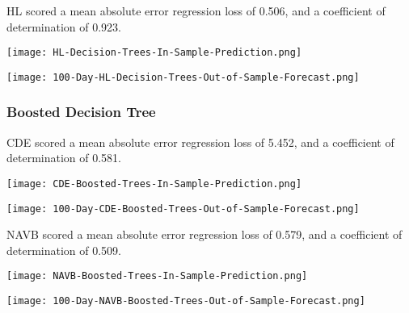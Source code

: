HL scored a mean absolute error regression loss of 0.506, and a coefficient of determination of 0.923.

\begin{center}
    \texttt{[image: HL-Decision-Trees-In-Sample-Prediction.png]}
    \label{fig:nonfloat}
\end{center}

\begin{center}  
    \texttt{[image: 100-Day-HL-Decision-Trees-Out-of-Sample-Forecast.png]}
    \label{fig:nonfloat}
\end{center}

\subsubsection{Boosted Decision Tree}

CDE scored a mean absolute error regression loss of 5.452, and a coefficient of determination of 0.581.

\begin{center}
    \texttt{[image: CDE-Boosted-Trees-In-Sample-Prediction.png]}
    \label{fig:nonfloat}
\end{center}

\begin{center}  
    \texttt{[image: 100-Day-CDE-Boosted-Trees-Out-of-Sample-Forecast.png]}
    \label{fig:nonfloat}
\end{center}

NAVB scored a mean absolute error regression loss of 0.579, and a coefficient of determination of 0.509.

\begin{center}
    \texttt{[image: NAVB-Boosted-Trees-In-Sample-Prediction.png]}
    \label{fig:nonfloat}
\end{center}

\begin{center}  
    \texttt{[image: 100-Day-NAVB-Boosted-Trees-Out-of-Sample-Forecast.png]}
    \label{fig:nonfloat}
\end{center}

